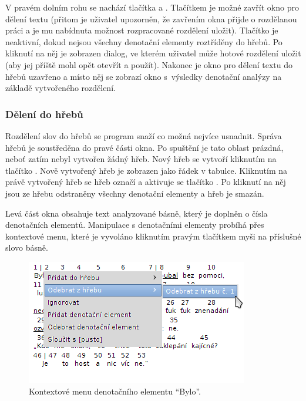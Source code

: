 \documentclass[dp.tex]{subfiles}
\begin{document}
V pravém dolním rohu se nachází tlačítka  a . Tlačítkem  je možné zavřít okno pro dělení textu (přitom je uživatel upozorněn, že zavřením okna přijde o rozdělanou práci a je mu nabídnuta možnost rozpracované rozdělení uložit). Tlačítko  je neaktivní, dokud nejsou všechny denotační elementy roztříděny do hřebů. Po kliknutí na něj je zobrazen dialog, ve kterém uživatel může hotové rozdělení uložit (aby jej příště mohl opět otevřít a použít). Nakonec je okno pro dělení textu do hřebů uzavřeno a místo něj se zobrazí okno s~výsledky denotační analýzy na základě vytvořeného rozdělení.

\subsubsection{Dělení do hřebů}

Rozdělení slov do hřebů se program snaží co možná nejvíce usnadnit. Správa hřebů je soustředěna do pravé části okna. Po spuštění je tato oblast prázdná, neboť zatím nebyl vytvořen žádný hřeb. Nový hřeb se vytvoří kliknutím na tlačítko . Nově vytvořený hřeb je zobrazen jako řádek v tabulce. Kliknutím na právě vytvořený hřeb se hřeb označí a aktivuje se tlačítko . Po kliknutí na něj jsou ze hřebu odstraněny všechny denotační elementy a hřeb je smazán.

Levá část okna obsahuje text analyzované básně, který je doplněn o čísla denotačních elementů. Manipulace s denotačními elementy probíhá přes kontextové menu, které je vyvoláno kliknutím pravým tlačítkem myši na příslušné slovo básně.

\begin{figure}[H]
\centering
\includegraphics[max width=\textwidth,keepaspectratio=true]{imgs-60-aplikace/gui-denotation-element-menu}
\caption{Kontextové menu denotačního elementu \enquote{Bylo}.}
\label{fig:gui-denotation-menu}
\end{figure}
\end{document}
